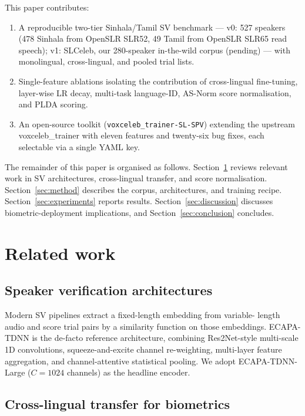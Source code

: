 \documentclass[11pt,a4paper]{article}
\begin{document}
This paper contributes:
\begin{enumerate}
    \item A reproducible two-tier Sinhala/Tamil SV benchmark ---
    v0: 527 speakers (478 Sinhala from OpenSLR SLR52, 49 Tamil from
    OpenSLR SLR65 read speech); v1: SLCeleb, our 280-speaker
    in-the-wild corpus (pending) --- with monolingual, cross-lingual,
    and pooled trial lists.
    \item Single-feature ablations isolating the contribution of
    cross-lingual fine-tuning, layer-wise LR decay, multi-task
    language-ID, AS-Norm score normalisation, and PLDA scoring.
    \item An open-source toolkit
    (\texttt{voxceleb\_trainer-SL-SPV}) \cite{slspv2026repo}
    extending the upstream voxceleb\_trainer with eleven features and
    twenty-six bug fixes, each selectable via a single YAML key.
\end{enumerate}

The remainder of this paper is organised as follows.
Section~\ref{sec:related} reviews relevant work in SV architectures,
cross-lingual transfer, and score normalisation.
Section~\ref{sec:method} describes the corpus, architectures, and
training recipe.
Section~\ref{sec:experiments} reports results.
Section~\ref{sec:discussion} discusses biometric-deployment
implications, and Section~\ref{sec:conclusion} concludes.

\section{Related work}
\label{sec:related}

\subsection{Speaker verification architectures}
\label{sec:related:arch}

Modern SV pipelines extract a fixed-length embedding from variable-
length audio and score trial pairs by a similarity function on those
embeddings. ECAPA-TDNN \cite{desplanques2020ecapa} is the de-facto
reference architecture, combining Res2Net-style multi-scale 1D
convolutions, squeeze-and-excite channel re-weighting, multi-layer
feature aggregation, and channel-attentive statistical pooling. We
adopt ECAPA-TDNN-Large ($C=1024$ channels) as the headline encoder.

\subsection{Cross-lingual transfer for biometrics}
\label{sec:related:transfer}
\end{document}
